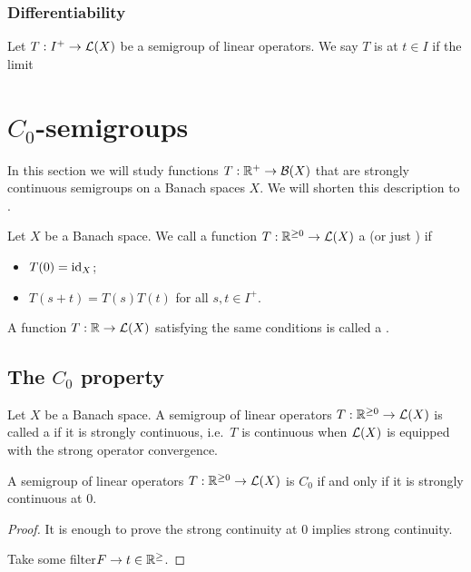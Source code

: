 \subsection{Differentiability}
\begin{definition}
Let $T: I^+ \to \operatorname{\mathcal{L}}(X)$ be a semigroup of linear operators. We say $T$ is  at $t\in I$ if the limit
\[  \]
\end{definition}


\chapter{$C_0$-semigroups}
In this section we will study functions $T: \mathbb{R}^+\to \operatorname{\mathcal{B}}(X)$ that are strongly continuous semigroups on a Banach spaces $X$. We will shorten this description to .

\begin{definition}
Let $X$ be a Banach space. We call a function $T: \mathbb{R}^{\geq 0} \to \operatorname{\mathcal{L}}(X)$ a  (or just ) if
\begin{itemize}
\item $T(0) = \operatorname{id}_X$;
\item $T(s+t) = T(s)T(t)$ for all $s,t \in I^+$.
\end{itemize}
A function $T: \mathbb{R} \to \operatorname{\mathcal{L}}(X)$ satisfying the same conditions is called a .
\end{definition}

\section{The $C_0$ property}
\begin{definition}
Let $X$ be a Banach space. A semigroup of linear operators $T: \mathbb{R}^{\geq 0} \to \operatorname{\mathcal{L}}(X)$ is called a  if it is strongly continuous, i.e.\ $T$ is continuous when $\operatorname{\mathcal{L}}(X)$ is equipped with the strong operator convergence.
\end{definition}

\begin{lemma}
A semigroup of linear operators $T: \mathbb{R}^{\geq 0} \to \operatorname{\mathcal{L}}(X)$ is $C_0$ \textup{if and only if} it is strongly continuous at $0$.
\end{lemma}
\begin{proof}
It is enough to prove the strong continuity at $0$ implies strong continuity.

Take some filter$F\to t\in\mathbb{R}^{\geq}$.
\end{proof}

